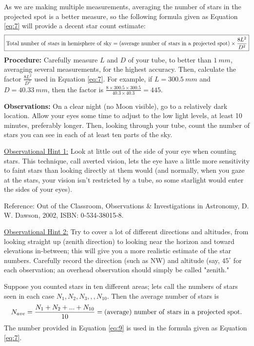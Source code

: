 \documentclass{article}
\begin{document}
As we are making multiple measurements, averaging the number of stars in the projected spot is a better measure, so
the following formula given as Equation \ref{eq:7} will provide a decent star count estimate:
\begin{equation} \label{eq:7}
\boxed{{\rm Total~number~of~stars~in~hemisphere~of~sky}=({\rm average~number~of~stars~in~a~projected~spot}) \times \frac{8L^2}{D^2}}
\end{equation}
{\bf Procedure:}  Carefully measure $L$ and $D$ of your tube, to better than $1~mm$, averaging several measurements, for the highest accuracy. Then, calculate the factor $\frac{8L^2}{D^2}$ used in Equation \ref{eq:7}. For example, if $L=300.5~mm$ and $D=40.33~mm$, then the factor is $\frac{8\times 300.5 \times 300.5}{40.3 \times 40.3} = 445$.

{\bf Observations:} On a clear night (no Moon visible), go to a relatively dark location. Allow your eyes some time to adjust to the low light levels, at least 10 minutes, preferably longer.  Then, looking through your tube, count the number of stars you can see in each of at least ten parts of the sky.

\underline{Observational Hint 1:} Look at little out of the side of your eye when counting stars. This technique, call averted vision, lets the eye have a little more sensitivity to faint stars than looking directly at them would (and normally, when you gaze at the stars, your vision isn't restricted by a tube, so some starlight would enter the sides of your eyes).

\vfill
\eightrm Reference: Out of the Classroom, Observations \& Investigations in Astronomy, D. W. Dawson, 2002, ISBN: 0-534-38015-8.
\newpage
\vphantom{testing}

\underline{Observational Hint 2:}  Try to cover a lot of different directions and altitudes, from looking straight up (zenith direction) to looking near the horizon and toward elevations in-between; this will give you a more realistic estimate of the star numbers. Carefully record the direction (such as NW) and altitude (say, $45^\circ$ for each observation; an overhead observation should simply be called "zenith."

Suppose you counted stars in ten different areas; lets call the numbers of stars seen in each case $N_1, N_2, N_3,,, N_10$. Then the average number of stars is 
\begin{equation} \label{eq:9}
N_{ave} = \frac{N_1 + N_2 + ... + N_{10}}{10} = {\rm (average)~number~of~stars~in~a~projected~spot.}
\end{equation}
The number provided in Equation \ref{eq:9} is used in the formula given as Equation \ref{eq:7}.
\end{document}
